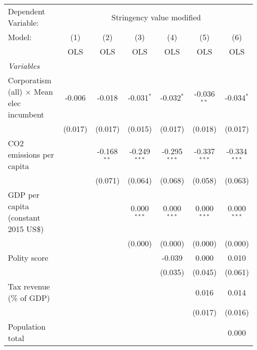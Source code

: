 
\begingroup
\centering
\begin{tabular}{lcccccc}
   \toprule
   Dependent Variable: & \multicolumn{6}{c}{Stringency value modified}\\
   Model:                                          & (1)     & (2)           & (3)            & (4)            & (5)            & (6)\\  
                                                   &  OLS    & OLS           & OLS            & OLS            & OLS            & OLS\\  
   \midrule
   \emph{Variables}\\
   Corporatism (all) $\times$ Mean elec incumbent  & -0.006  & -0.018        & -0.031$^{*}$   & -0.032$^{*}$   & -0.036$^{**}$  & -0.034$^{*}$\\   
                                                   & (0.017) & (0.017)       & (0.015)        & (0.017)        & (0.018)        & (0.017)\\   
   CO2 emissions per capita                        &         & -0.168$^{**}$ & -0.249$^{***}$ & -0.295$^{***}$ & -0.337$^{***}$ & -0.334$^{***}$\\   
                                                   &         & (0.071)       & (0.064)        & (0.068)        & (0.058)        & (0.063)\\   
   GDP per capita (constant 2015 US\$)             &         &               & 0.000$^{***}$  & 0.000$^{***}$  & 0.000$^{***}$  & 0.000$^{***}$\\   
                                                   &         &               & (0.000)        & (0.000)        & (0.000)        & (0.000)\\   
   Polity score                                    &         &               &                & -0.039         & 0.000          & 0.010\\   
                                                   &         &               &                & (0.035)        & (0.045)        & (0.061)\\   
   Tax revenue (\% of GDP)                         &         &               &                &                & 0.016          & 0.014\\   
                                                   &         &               &                &                & (0.017)        & (0.016)\\   
   Population total                                &         &               &                &                &                & 0.000\\   

\end{tabular}
